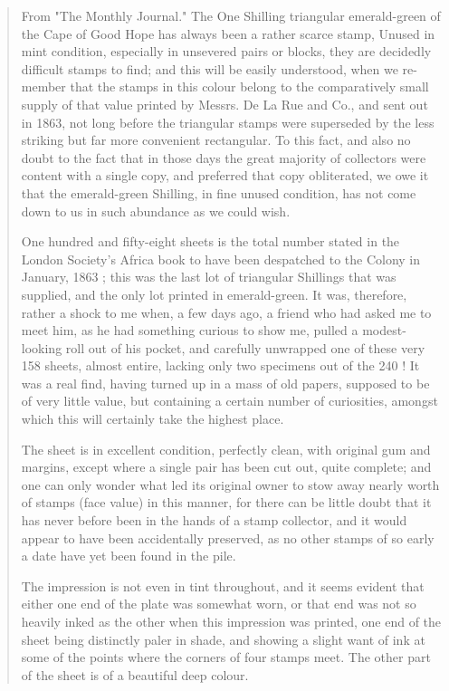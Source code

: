 \begin{quotation}
From "The Monthly Journal." The One Shilling triangular emerald-green of the Cape of Good Hope
has always been a rather scarce stamp, Unused in mint condition,
especially in unsevered pairs or blocks, they are decidedly difficult stamps to find; and this will be easily understood, when we re- member that the stamps in this colour belong to the comparatively small supply of that value printed by Messrs. De La Rue and Co., and sent out
in 1863, not long before the triangular stamps were superseded by the less striking but far more convenient rectangular. To this fact, and also no doubt
to the fact that in those days the great majority of collectors were content
with a single copy, and preferred that copy obliterated, we owe it that the
emerald-green Shilling, in fine unused condition, has not come down to us in such abundance as we could wish. 


One hundred and fifty-eight sheets is the total number stated in the London
Society's Africa book to have been despatched to the Colony in January, 1863 ; this was the last lot of triangular Shillings that was supplied, and the only lot printed in emerald-green. It was, therefore, rather a shock to me when,
a few days ago, a friend who had asked me to meet him, as he had something curious to show me, pulled a modest-looking roll out of his pocket, and
carefully unwrapped one of these very 158 sheets, almost entire, lacking only two specimens out of the 240 ! It was a real find, having turned up in a mass
of old papers, supposed to be of very little value, but containing a certain number of curiosities, amongst which this will certainly take the highest place. 

The sheet is in excellent condition, perfectly clean, with original gum and
margins, except where a single pair has been cut out, quite complete; and
one can only wonder what led its original owner to stow away nearly 
worth of stamps (face value) in this manner, for there can be little doubt that
it has never before been in the hands of a stamp collector, and it would appear
to have been accidentally preserved, as no other stamps of so early a date have
yet been found in the pile. 

The impression is not even in tint throughout, and it seems evident that
either one end of the plate was somewhat worn, or that end was not so
heavily inked as the other when this impression was printed, one end of the
sheet being distinctly paler in shade, and showing a slight want of ink at some
of the points where the corners of four stamps meet. The other part of the
sheet is of a beautiful deep colour.


\end{quotation}
